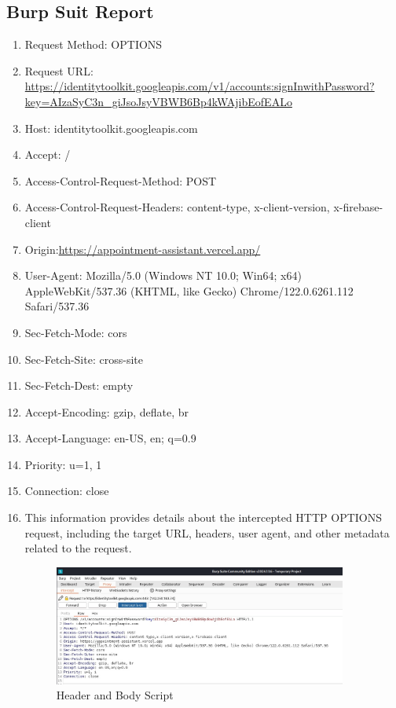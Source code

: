 \documentclass[openany]{report}
\begin{document}
\subsection{Burp Suit Report}
\begin{enumerate}
    \item Request Method: OPTIONS
    \item Request URL: \url {https://identitytoolkit.googleapis.com/v1/accounts:signInwithPassword?key=AIzaSyC3n_giJsoJsyVBWB6Bp4kWAjibEofEALo}
    \item Host: identitytoolkit.googleapis.com
    \item Accept: /
    \item Access-Control-Request-Method: POST
    \item Access-Control-Request-Headers: content-type, x-client-version, x-firebase-client
    \item Origin:\url {https://appointment-assistant.vercel.app/}
    \item User-Agent: Mozilla/5.0 (Windows NT 10.0; Win64; x64) AppleWebKit/537.36 (KHTML, like Gecko) Chrome/122.0.6261.112 Safari/537.36
    \item Sec-Fetch-Mode: cors
    \item Sec-Fetch-Site: cross-site
    \item Sec-Fetch-Dest: empty
    \item Accept-Encoding: gzip, deflate, br
    \item Accept-Language: en-US, en; q=0.9
    \item Priority: u=1, 1
    \item Connection: close
    \item This information provides details about the intercepted HTTP OPTIONS request, including the target URL, headers, user agent, and other metadata related to the request.
          \begin{figure}[H]
              \centering
              \includegraphics[width=0.91\textwidth]{imgs/PacketCapture.jpg}
              \caption{ Header and Body Script}
              \label{fig:my_label12}
          \end{figure}
\end{enumerate}
\end{document}
